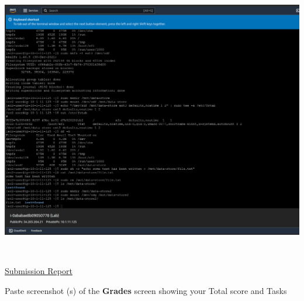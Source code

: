 \documentclass[11pt]{article}
\begin{document}
\begin{enumerate}[resume]
    {\centering
    \includegraphics[width=6.1in, height=4.8in]{pics/13.png}
    }

\end{enumerate}




\newpage

\noindent\underline{Submission Report}

\vspace{0.5cm}

\noindent Paste screenshot (s) of the \textbf{Grades} screen showing your Total score and Tasks \\



\vspace{5mm}
\end{document}
